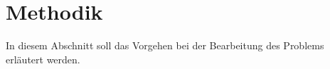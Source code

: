 \section{Methodik}

In diesem Abschnitt soll das Vorgehen bei der Bearbeitung des Problems erläutert werden.





